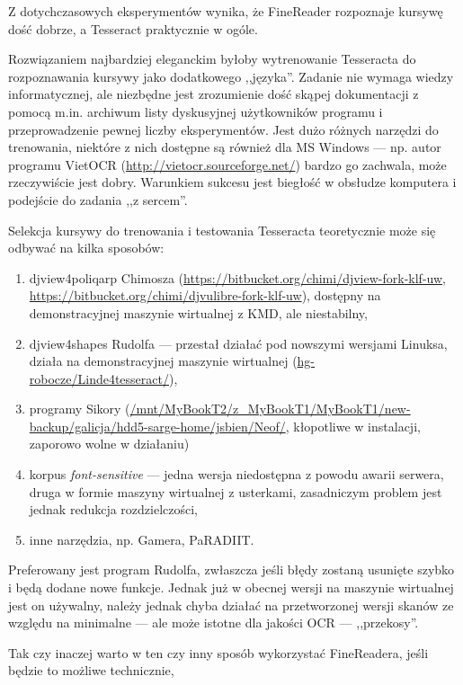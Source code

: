 \documentclass[12]{mwart}
\newcommand{\program}[1]{\textsf{#1}}
\begin{document}
Z dotychczasowych eksperymentów wynika, że \program{FineReader}
rozpoznaje kursywę dość dobrze, a \program{Tesseract} praktycznie w
ogóle.

Rozwiązaniem najbardziej eleganckim byłoby wytrenowanie
\program{Tesseracta} do rozpoznawania kursywy jako dodatkowego
,,języka''. Zadanie nie wymaga wiedzy informatycznej, ale niezbędne
jest zrozumienie dość skąpej dokumentacji z pomocą m.in. archiwum
listy dyskusyjnej użytkowników programu i przeprowadzenie pewnej
liczby eksperymentów. Jest dużo różnych narzędzi do trenowania,
niektóre z nich dostępne są również dla MS Windows --- np. autor
programu \program{VietOCR} (\url{http://vietocr.sourceforge.net/})
bardzo go zachwala, może rzeczywiście jest dobry. Warunkiem sukcesu
jest biegłość w obsłudze komputera i podejście do zadania ,,z
sercem''.

Selekcja kursywy do trenowania i testowania \program{Tesseracta} teoretycznie może
się odbywać na kilka sposobów:
\begin{enumerate}
\item \program{djview4poliqarp} Chimosza
  (\url{https://bitbucket.org/chimi/djview-fork-klf-uw},
  \url{https://bitbucket.org/chimi/djvulibre-fork-klf-uw}), dostępny
  na demonstracyjnej maszynie wirtualnej z KMD, ale niestabilny,
\item \program{djview4shapes} Rudolfa --- przestał działać pod
  nowszymi wersjami Linuksa, działa na demonstracyjnej maszynie
  wirtualnej (\url{hg-robocze/Linde4tesseract/}),
\item programy Sikory
  (\url{/mnt/MyBookT2/z_MyBookT1/MyBookT1/new-backup/galicja/hdd5-sarge-home/jsbien/Neof/}, kłopotliwe w instalacji,
  zaporowo wolne w działaniu)
\item korpus \textit{font-sensitive} --- jedna wersja niedostępna z
  powodu awarii serwera, druga w formie maszyny wirtualnej z
  usterkami, zasadniczym problem jest jednak redukcja rozdzielczości,
\item inne narzędzia, np. \program{Gamera}, \program{PaRADIIT}.
\end{enumerate}
Preferowany jest program Rudolfa, zwłaszcza jeśli błędy zostaną
usunięte szybko i będą dodane nowe funkcje. Jednak już w obecnej
wersji na maszynie wirtualnej jest on używalny, należy jednak chyba
działać na przetworzonej wersji skanów ze względu na minimalne --- ale
może istotne dla jakości OCR --- ,,przekosy''.

Tak czy inaczej warto w ten czy inny sposób wykorzystać
\program{FineReadera}, jeśli będzie to możliwe technicznie,
\end{document}

